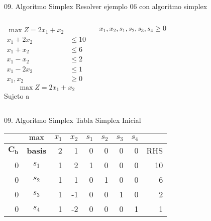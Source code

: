 \begin{frameExample}{09. Algoritmo Simplex}{}
  Resolver ejemplo 06 con algoritmo simplex
  \begin{columns}
        \begin{align*}
      \max Z = 2x_1 + x_2 & \\[3mm]
    x_1 + 2x_2 & \leq 10\\
    x_1 + x_2 & \leq 6\\
    x_1 - x_2 & \leq 2\\
    x_1 - 2x_2 & \leq 1\\[5mm]
    x_1, x_2 & \geq 0
        \end{align*}
        \[ \max Z = 2x_1 + x_2 \]
      Sujeto a %

$x_1, x_2, s_1, s_2, s_3, s_4  \geq 0$
  \end{columns}
\end{frameExample}

\begin{frameExample}{09. Algoritmo Simplex}{}
  Tabla Simplex Inicial
  
  {\centering
\begin{tabular}{rc|rr|rrrr|r}
  &$\max$  & $x_1$ & $x_2$ & $s_1$ &$ s_2$ & $s_3$ & $s_4$ &  \\
  \toprule
  $\mathbf{C_b}$ & \textbf{basis} & 2 & 1 & 0 & 0 & 0 & 0 & RHS \\
  \midrule
0 & $s_1$ & 1 & 2 & 1 & 0 & 0 & 0 & 10 \\
0 & $s_2$ & 1 & 1 & 0 & 1 & 0 & 0 & 6 \\
0 & $s_3$ & 1 & -1 & 0 & 0 & 1 & 0 & 2 \\
  0 & $s_4$ & 1 & -2 & 0 & 0 & 0 & 1 & 1\\
  \bottomrule
\end{tabular}
  \par}
\end{frameExample}

